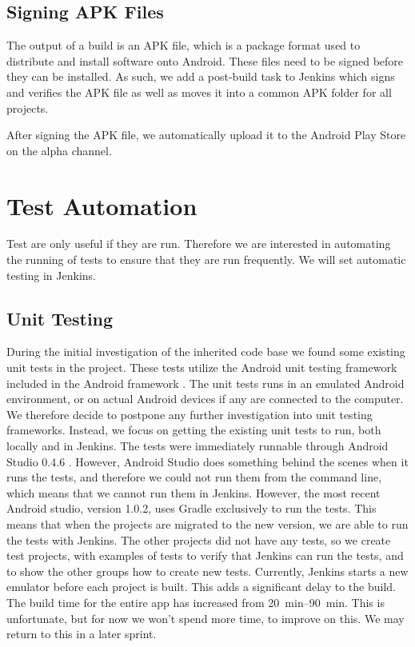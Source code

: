 
\subsection{Signing APK Files}
The output of a build is an APK file, which is a package format used to distribute and install software onto Android. These files need to be signed before they can be installed. As such, we add a post-build task to Jenkins which signs and verifies the APK file as well as moves it into a common APK folder for all projects.

After signing the APK file, we automatically upload it to the Android Play Store on the alpha channel. 

\section{Test Automation}\label{sec:test_automation}
Test are only useful if they are run. Therefore we are interested in automating the running of tests to ensure that they are run frequently. We will set automatic testing in Jenkins.
\subsection{Unit Testing}
During the initial investigation of the inherited code base we found some existing unit tests in the  project. These tests utilize the Android unit testing framework  included in the Android framework \parencite{AndroidUnit}. The unit tests runs in an emulated Android environment, or on actual Android devices if any are connected to the computer. We therefore decide to postpone any further investigation into unit testing frameworks. Instead, we focus on getting the existing unit tests to run, both locally and in Jenkins. The tests were immediately runnable through Android Studio 0.4.6 . However, Android Studio does something behind the scenes when it runs the tests, and therefore we could not run them from the command line, which means that we cannot run them in Jenkins. However, the most recent Android studio, version 1.0.2, uses Gradle exclusively to run the tests. This means that when the projects are migrated to the new version, we are able to run the tests with Jenkins.
The other projects did not have any tests, so we create test projects, with examples of tests to verify that Jenkins can run the tests, and to show the other groups how to create new tests.
Currently, Jenkins starts a new emulator before each project is built. This adds a significant delay to the build. The build time for the entire app has increased from \SIrange[range-units = single]{20}{90}{\minute}. This is unfortunate, but for now we won't spend more time, to improve on this. We may return to this in a later sprint.

